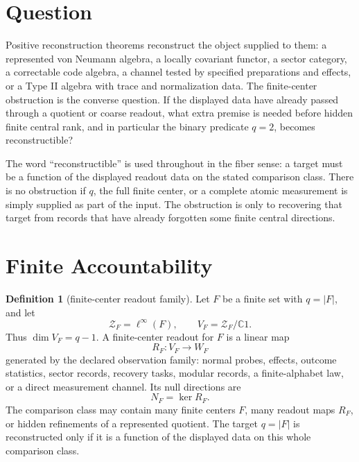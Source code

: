 \documentclass[12pt]{article}
\theoremstyle{definition}
\newtheorem{definition}{Definition}
\theoremstyle{remark}
\newcommand{\C}{\mathbb C}
\newcommand{\Z}{\mathcal Z}
\begin{document}
\section{Question}

Positive reconstruction theorems reconstruct the object supplied to them: a
represented von Neumann algebra, a locally covariant functor, a sector
category, a correctable code algebra, a channel tested by specified
preparations and effects, or a Type II algebra with trace and normalization
data.  The finite-center obstruction is the converse question.  If the
displayed data have already passed through a quotient or coarse readout, what
extra premise is needed before hidden finite central rank, and in particular
the binary predicate \(q=2\), becomes reconstructible?

The word ``reconstructible'' is used throughout in the fiber sense: a target
must be a function of the displayed readout data on the stated comparison
class.  There is no obstruction if \(q\), the full finite center, or a complete
atomic measurement is simply supplied as part of the input.  The obstruction is
only to recovering that target from records that have already forgotten some
finite central directions.

\section{Finite Accountability}

\begin{definition}[finite-center readout family]
Let \(F\) be a finite set with \(q=|F|\), and let
\[
  \Z_F=\ell^\infty(F),\qquad V_F=\Z_F/\C 1 .
\]
Thus \(\dim V_F=q-1\).  A finite-center readout for \(F\) is a linear map
\[
  R_F:V_F\longrightarrow W_F
\]
generated by the declared observation family: normal probes, effects, outcome
statistics, sector records, recovery tasks, modular records, a finite-alphabet
law, or a direct measurement channel.  Its null directions are
\[
  N_F=\ker R_F .
\]
The comparison class may contain many finite centers \(F\), many readout maps
\(R_F\), or hidden refinements of a represented quotient.  The target \(q=|F|\)
is reconstructed only if it is a function of the displayed data on this whole
comparison class.
\end{definition}
\end{document}
